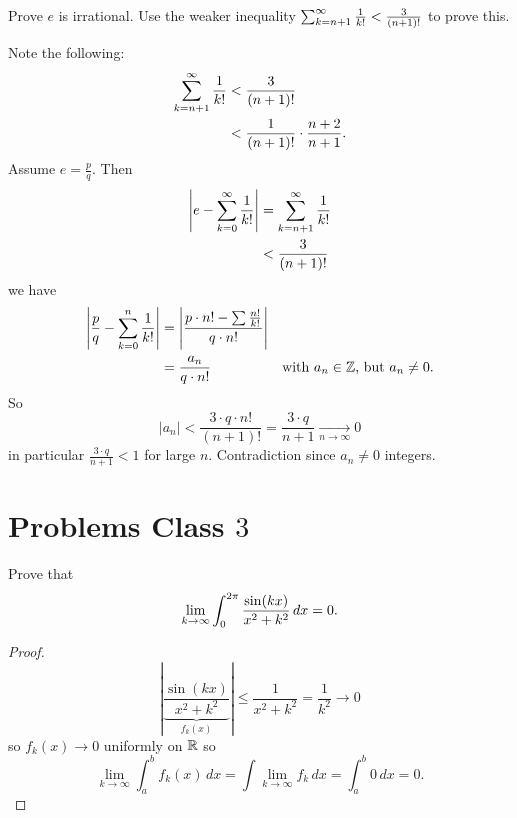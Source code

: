 \documentclass[10pt, a4paper]{article}
\begin{document}
\begin{problem}[7]
    Prove $e$ is irrational.
    Use the weaker inequality $\infsum[k = n + 1]\frac{1}{k!} < \frac{3}{(n + 1)!}$ to prove this.
    
    \begin{solution}
        Note the following:
        \begin{align*}
            \infsum[k = n + 1]\frac{1}{k!} &< \frac{3}{(n + 1)!} \\
            &< \frac{1}{(n + 1)!}\cdot\frac{n + 2}{n + 1}.
        \end{align*}
        Assume $e = \frac{p}{q}$.
        Then
        \begin{align*}
            \left|e - \infsumo\frac{1}{k!}\right| &= \infsum[k = n + 1]\frac{1}{k!} \\
            &< \frac{3}{(n + 1)!}
        \end{align*}
        we have
        \begin{align*}
            \left|\frac{p}{q} - \sum_{k = 0}^{n}\frac{1}{k!}\right| &= \left|\frac{p\cdot n! - \sum\frac{n!}{k!}}{q\cdot n!}\right| \\
            &= \frac{a_n}{q\cdot n!}&\text{with $a_n \in \Z$, but $a_n \neq 0$}.
        \end{align*}
        So
        \[
        |a_n| < \frac{3 \cdot q \cdot n!}{(n + 1)!} = \frac{3\cdot q}{n + 1} \xrightarrow[n \rightarrow \infty]{} 0
        \]
        in particular $\frac{3\cdot q}{n + 1} < 1$ for large $n$.
        Contradiction since $a_n \neq 0$ integers.
    \end{solution}
\end{problem}

\newpage

\section{Problems Class \texorpdfstring{$3$}{}}

\begin{problem}
    Prove that
    \[
    \liminfty[k]\int_{0}^{2\pi}\frac{\sin(kx)}{x ^ 2 + k ^ 2}\,dx = 0.
    \]

    \begin{proof}
        \[
        \left|\underbrace{\frac{\sin(kx)}{x ^ 2 + k ^ 2}}_{f_k(x)}\right| \leq \frac{1}{x ^ 2 + k ^ 2} = \frac{1}{k ^ 2} \to 0
        \]
        so $f_k(x) \to 0$ uniformly on $\R$ so
        \[
        \lim_{k \to \infty}\int_{a}^{b}f_k(x)\,dx = \int\lim_{k \to \infty}f_k\,dx = \int_{a}^{b}0\,dx = 0.
        \]
    \end{proof}
\end{problem}
\end{document}

